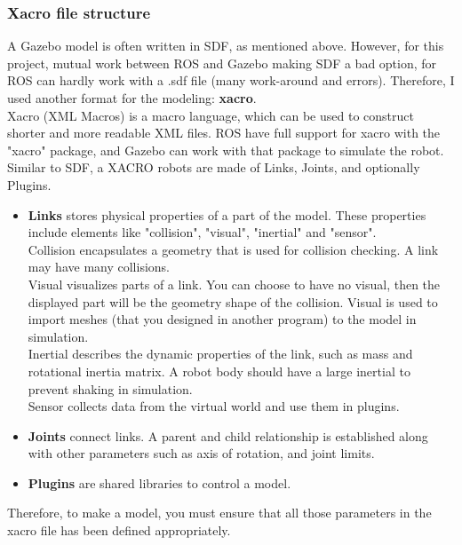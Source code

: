 \documentclass[pdftex,12pt,a4paper]{article}
\begin{document}
  \subsubsection{Xacro file structure}
  A Gazebo model is often written in SDF, as mentioned above. However, for this project, mutual work between ROS and Gazebo making SDF a bad option, for ROS can hardly work with a .sdf file (many work-around and errors). Therefore, I used another format for the modeling: \textbf{xacro}.\\
  Xacro (XML Macros) is a macro language, which can be used to construct shorter and more readable XML files. ROS have full support for xacro with the "xacro" package, and Gazebo can work with that package to simulate the robot.\\
  Similar to SDF, a XACRO robots are made of Links, Joints, and optionally Plugins.
  \begin{itemize}
  \item \textbf{Links} stores physical properties of a part of the model. These properties include elements like "collision", "visual", "inertial" and "sensor".\\
  Collision encapsulates a geometry that is used for collision checking. A link may have many collisions.\\
  Visual visualizes parts of a link. You can choose to have no visual, then the displayed part will be the geometry shape of the collision. Visual is used to import meshes (that you designed in another program) to the model in simulation.\\
  Inertial describes the dynamic properties of the link, such as mass and rotational inertia matrix. A robot body should have a large inertial to prevent shaking in simulation.\\
  Sensor collects data from the virtual world and use them in plugins.
  \item \textbf{Joints} connect links. A parent and child relationship is established along with other parameters such as axis of rotation, and joint limits.
  \item \textbf{Plugins} are shared libraries to control a model.
  \end{itemize}
  Therefore, to make a model, you must ensure that all those parameters in the xacro file has been defined appropriately.
  
\end{document}

